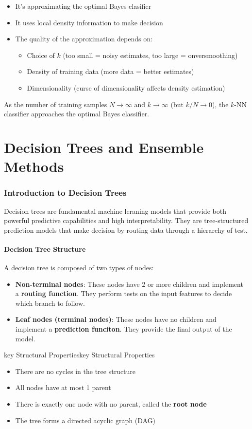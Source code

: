 \documentclass[a4paper]{article}
\theoremstyle{definition}
\begin{document}
\begin{itemize}
    \item It's approximating the optimal Bayes clasifier 
    \item It uses local density information to make decision 
    \item The quality of the approximation depends on:
    \begin{itemize}
        \item Choice of \( k \) (too small = noisy estimates, too large = onversmoothing)
        \item Density of training data (more data = better estimates)
        \item Dimensionality (curse of dimensionality affects density estimation)
    \end{itemize}
\end{itemize}
As the number of training samples \( N \to \infty \) and \( k \to \infty \) (but \( k/N \to 0 \)), the \( k \)-NN
classifier approaches the optimal Bayes classifier.

\part{Decision Trees and Ensemble Methods}
\section{Introduction to Decision Trees}
Decision trees are fundamental machine leraning models that provide both powerful predictive capabilities and  high interpretability.
They are tree-structured prediction models that make decision by routing data through a hierarchy of test.
\subsection{Decision Tree Structure}
A decision tree is composed of two types of nodes:
\begin{itemize}
    \item \textbf{Non-terminal nodes}: These nodes have 2 or more children and implement a \textbf{routing function}.
        They perform tests on the input features to decide which branch to follow.
    \item \textbf{Leaf nodes (terminal nodes)}: These nodes have no children and implement a \textbf{prediction funciton}. They provide the final output of the model.
\end{itemize}
\begin{definition}{key Structural Properties}{key Structural Properties}
\begin{itemize}
    \item There are no cycles in the tree structure 
    \item All nodes have at most 1 parent 
    \item There is exactly one node with no parent, called the \textbf{root node}
    \item The tree forms a directed acyclic graph (DAG)
\end{itemize}
\end{definition}
\end{document}
